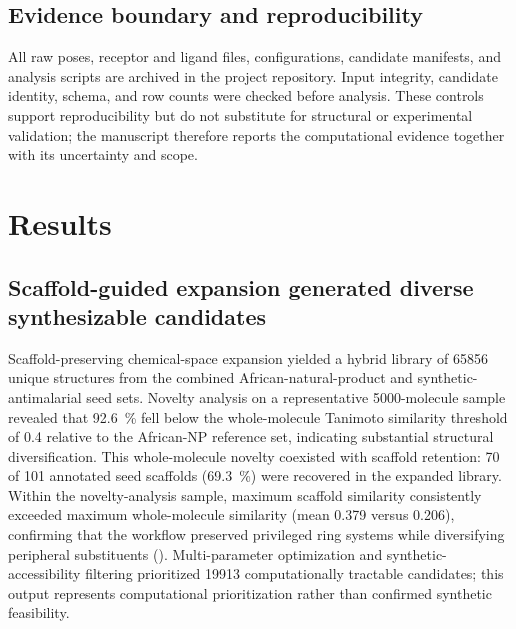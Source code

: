 \documentclass[journal=jcisd8,manuscript=article]{achemso}
\begin{document}
\subsection{Evidence boundary and reproducibility}
All raw poses, receptor and ligand files, configurations, candidate manifests, and analysis scripts are archived in the project repository. Input integrity, candidate identity, schema, and row counts were checked before analysis. These controls support reproducibility but do not substitute for structural or experimental validation; the manuscript therefore reports the computational evidence together with its uncertainty and scope.

\section{Results}
\subsection{Scaffold-guided expansion generated diverse synthesizable candidates}
Scaffold-preserving chemical-space expansion yielded a hybrid library of \num{65856} unique structures from the combined African-natural-product and synthetic-antimalarial seed sets. Novelty analysis on a representative \num{5000}-molecule sample revealed that \qty{92.6}{\percent} fell below the whole-molecule Tanimoto similarity threshold of \num{0.4} relative to the African-NP reference set, indicating substantial structural diversification. This whole-molecule novelty coexisted with scaffold retention: \num{70} of \num{101} annotated seed scaffolds (\qty{69.3}{\percent}) were recovered in the expanded library. Within the novelty-analysis sample, maximum scaffold similarity consistently exceeded maximum whole-molecule similarity (mean \num{0.379} versus \num{0.206}), confirming that the workflow preserved privileged ring systems while diversifying peripheral substituents (). Multi-parameter optimization and synthetic-accessibility filtering prioritized \num{19913} computationally tractable candidates; this output represents computational prioritization rather than confirmed synthetic feasibility.
\end{document}
